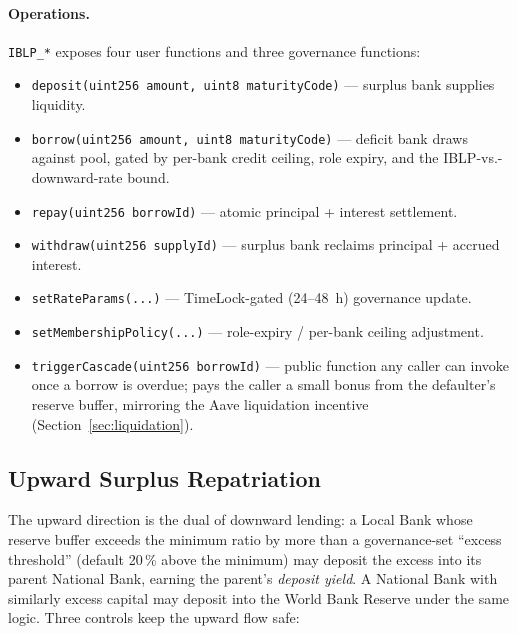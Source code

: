 \documentclass[12pt,a4paper]{report}
\begin{document}
\paragraph{Operations.}
\texttt{IBLP\_*} exposes four user functions and three governance functions:

\begin{itemize}[noitemsep]
\item \texttt{deposit(uint256 amount, uint8 maturityCode)} --- surplus bank supplies liquidity.
\item \texttt{borrow(uint256 amount, uint8 maturityCode)} --- deficit bank draws against pool, gated by per-bank credit ceiling, role expiry, and the IBLP-vs.-downward-rate bound.
\item \texttt{repay(uint256 borrowId)} --- atomic principal + interest settlement.
\item \texttt{withdraw(uint256 supplyId)} --- surplus bank reclaims principal + accrued interest.
\item \texttt{setRateParams(...)} --- TimeLock-gated (24--48~h) governance update.
\item \texttt{setMembershipPolicy(...)} --- role-expiry / per-bank ceiling adjustment.
\item \texttt{triggerCascade(uint256 borrowId)} --- public function any caller can invoke once a borrow is overdue; pays the caller a small bonus from the defaulter's reserve buffer, mirroring the Aave liquidation incentive (Section~\ref{sec:liquidation}).
\end{itemize}

\subsection{Upward Surplus Repatriation}
\label{sec:upward-flow}

The upward direction is the dual of downward lending: a Local Bank whose reserve buffer exceeds the minimum ratio by more than a governance-set ``excess threshold'' (default 20\,\% above the minimum) may deposit the excess into its parent National Bank, earning the parent's \emph{deposit yield}. A National Bank with similarly excess capital may deposit into the World Bank Reserve under the same logic. Three controls keep the upward flow safe:
\end{document}
